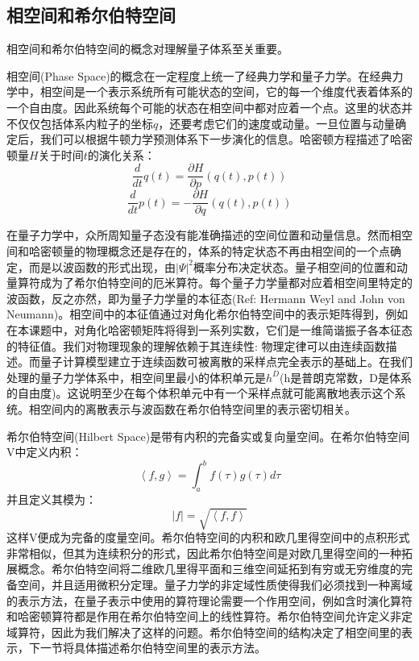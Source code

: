 
\subsection{相空间和希尔伯特空间}
相空间和希尔伯特空间的概念对理解量子体系至关重要。

相空间(Phase Space)的概念在一定程度上统一了经典力学和量子力学。在经典力学中，相空间是一个表示系统所有可能状态的空间，它的每一个维度代表着体系的一个自由度。因此系统每个可能的状态在相空间中都对应着一个点。这里的状态并不仅仅包括体系内粒子的坐标$q$，还要考虑它们的速度或动量。一旦位置与动量确定后，我们可以根据牛顿力学预测体系下一步演化的信息。哈密顿方程描述了哈密顿量$H$关于时间$t$的演化关系：
\begin{equation*}
  \frac{d}{dt}q(t) = \frac{\partial H}{\partial p}(q(t),p(t))
\end{equation*}
\begin{equation*}
  \frac{d}{dt}p(t) = -\frac{\partial H}{\partial q}(q(t),p(t))
\end{equation*}

在量子力学中，众所周知量子态没有能准确描述的空间位置和动量信息。然而相空间和哈密顿量的物理概念还是存在的，体系的特定状态不再由相空间的一个点确定，而是以波函数的形式出现，由${\left|\Psi\right|}^2$概率分布决定状态。量子相空间的位置和动量算符成为了希尔伯特空间的厄米算符。每个量子力学量都对应着相空间里特定的波函数，反之亦然，即为量子力学量的本征态(Ref: Hermann Weyl and John von Neumann)。相空间中的本征值通过对角化希尔伯特空间中的表示矩阵得到，例如在本课题中，对角化哈密顿矩阵将得到一系列实数，它们是一维简谐振子各本征态的特征值。我们对物理现象的理解依赖于其连续性: 物理定律可以由连续函数描述。而量子计算模型建立于连续函数可被离散的采样点完全表示的基础上。在我们处理的量子力学体系中，相空间里最小的体积单元是$ h^{D} $(h是普朗克常数，D是体系的自由度)。这说明至少在每个体积单元中有一个采样点就可能离散地表示这个系统。相空间内的离散表示与波函数在希尔伯特空间里的表示密切相关。

希尔伯特空间(Hilbert Space)是带有内积的完备实或复向量空间。在希尔伯特空间V中定义内积：
\begin{equation}
  \left< f,g \right> = \int_a^b f(\tau)g(\tau)d{\tau}
\end{equation}
并且定义其模为：
\begin{equation*}
  \left| f \right| = \sqrt{\left< f,f \right>}
\end{equation*}
这样V便成为完备的度量空间。希尔伯特空间的内积和欧几里得空间中的点积形式非常相似，但其为连续积分的形式，因此希尔伯特空间是对欧几里得空间的一种拓展概念。希尔伯特空间将二维欧几里得平面和三维空间延拓到有穷或无穷维度的完备空间，并且适用微积分定理。量子力学的非定域性质使得我们必须找到一种离域的表示方法，在量子表示中使用的算符理论需要一个作用空间，例如含时演化算符和哈密顿算符都是作用在希尔伯特空间上的线性算符。希尔伯特空间允许定义非定域算符，因此为我们解决了这样的问题。希尔伯特空间的结构决定了相空间里的表示，下一节将具体描述希尔伯特空间里的表示方法。


